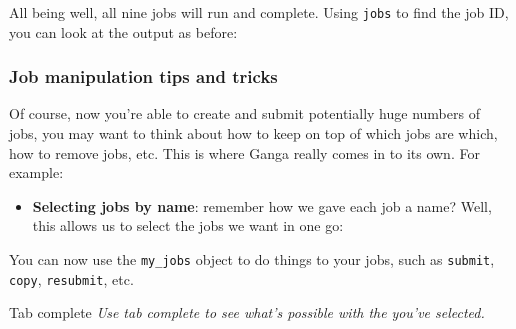 All being well, all nine jobs will run and complete. Using \texttt{jobs}
to find the job ID, you can look at the output as before:

\begin{Shaded}
\begin{Highlighting}[]
 \NormalTok{(}\NormalTok{, }\NormalTok{)}
\end{Highlighting}
\end{Shaded}

\subsubsection{Job manipulation tips and
tricks}\label{job-manipulation-tips-and-tricks}

Of course, now you're able to create and submit potentially huge numbers
of jobs, you may want to think about how to keep on top of which jobs
are which, how to remove jobs, etc. This is where Ganga really comes in
to its own. For example:

\begin{itemize}
\tightlist
\item
  \textbf{Selecting jobs by name}: remember how we gave each job a name?
  Well, this allows us to select the jobs we want in one go:
\end{itemize}

\begin{Shaded}
\begin{Highlighting}[]
 \NormalTok{)}

 
 
 \NormalTok{) } \KeywordTok{)}
\end{Highlighting}
\end{Shaded}

You can now use the \texttt{my\_jobs} object to do things to your jobs,
such as \texttt{submit}, \texttt{copy}, \texttt{resubmit}, etc.

\begin{hintbox}{Tab complete}
\emph{Use tab complete to see what's possible with the}
 \emph{you've selected.}
\end{hintbox}

